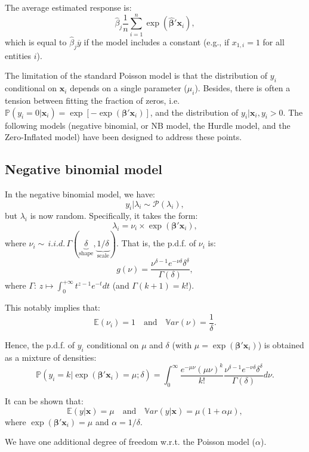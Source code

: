 \documentclass[
  12pt,
]{book}
\theoremstyle{definition}
\theoremstyle{definition}
\theoremstyle{definition}
\theoremstyle{definition}
\theoremstyle{remark}
\begin{document}
The average estimated response is:
\[
\widehat{\beta}_j \frac{1}{n}\sum_{i=1}^n  \exp(\widehat{\boldsymbol\beta}'\mathbf{x}_i),
\]
which is equal to \(\widehat{\beta}_j \overline{y}\) if the model includes a constant (e.g., if \(x_{1,i}=1\) for all entities \(i\)).

The limitation of the standard Poisson model is that the distribution of \(y_i\) conditional on \(\mathbf{x}_i\) depends on a single parameter (\(\mu_i\)). Besides, there is often a tension between fitting the fraction of zeros, i.e.~\(\mathbb{P}(y_i=0|\mathbf{x}_i)=\exp[-\exp(\boldsymbol\beta'\mathbf{x}_i)]\), and the distribution of \(y_i|\mathbf{x}_i,y_i>0\). The following models (negative binomial, or NB model, the Hurdle model, and the Zero-Inflated model) have been designed to address these points.

\hypertarget{negative-binomial-model}{%
\subsection{Negative binomial model}\label{negative-binomial-model}}

In the negative binomial model, we have:
\[
y_i|\lambda_i \sim \mathcal{P}(\lambda_i),
\]
but \(\lambda_i\) is now random. Specifically, it takes the form:
\[
\lambda_i = \nu_i \times \exp(\boldsymbol\beta'\mathbf{x}_i),
\]
where \(\nu_i \sim \,i.i.d.\,\Gamma(\underbrace{\delta}_{\mbox{shape}},\underbrace{1/\delta}_{\mbox{scale}})\). That is, the p.d.f. of \(\nu_i\) is:
\[
g(\nu) = \frac{\nu^{\delta - 1}e^{-\nu\delta}\delta^\delta}{\Gamma(\delta)},
\]
where \(\Gamma:\,z \mapsto \int_0^{+\infty}t^{z-1}e^{-t}dt\) (and \(\Gamma(k+1)=k!\)).

This notably implies that:
\[
\mathbb{E}(\nu_i) = 1 \quad \mbox{and} \quad \mathbb{V}ar(\nu) = \frac{1}{\delta}.
\]

Hence, the p.d.f. of \(y_i\) conditional on \(\mu\) and \(\delta\) (with \(\mu=\exp(\boldsymbol\beta'\mathbf{x}_i)\)) is obtained as a mixture of densities:
\[
\mathbb{P}(y_i=k|\exp(\boldsymbol\beta'\mathbf{x}_i)=\mu;\delta)=\int_0^\infty \frac{e^{-\mu \nu}(\mu \nu)^k}{k!} \frac{\nu^{\delta - 1}e^{-\nu\delta}\delta^\delta}{\Gamma(\delta)} d \nu.
\]

It can be shown that:
\[
\mathbb{E}(y|\mathbf{x}) = \mu \quad \mbox{and}\quad \mathbb{V}ar(y|\mathbf{x}) = \mu\left(1+\alpha \mu\right),
\]
where \(\exp(\boldsymbol\beta'\mathbf{x}_i)=\mu\) and \(\alpha = 1/\delta\).

We have one additional degree of freedom w.r.t. the Poisson model (\(\alpha\)).
\end{document}
